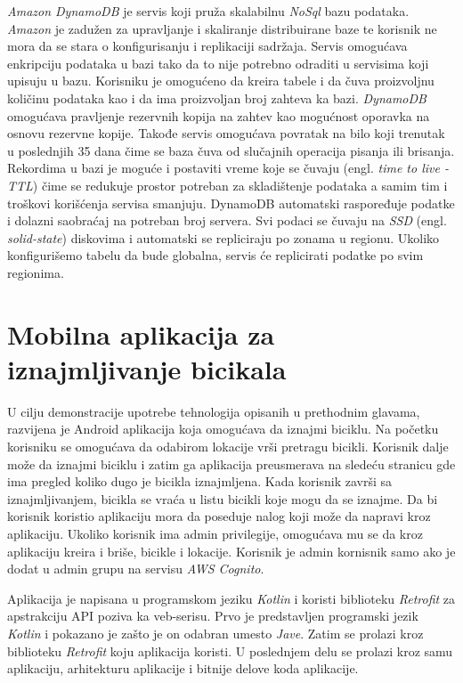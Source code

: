 \documentclass[12pt,oneside]{memoir}
\begin{document}
\emph{Amazon DynamoDB} je servis koji pruža skalabilnu \emph{NoSql} bazu podataka. \emph{Amazon} je zadužen za upravljanje i skaliranje distribuirane baze te korisnik ne mora da se stara o konfigurisanju i replikaciji sadržaja. Servis omogućava enkripciju podataka u bazi tako da to nije potrebno odraditi u servisima koji upisuju u bazu. Korisniku je omogućeno da kreira tabele i da čuva proizvoljnu količinu podataka kao i da ima proizvoljan broj zahteva ka bazi. \emph{DynamoDB} omogućava pravljenje rezervnih kopija na zahtev kao mogućnost oporavka na osnovu rezervne kopije. Takođe servis omogućava povratak na bilo koji trenutak u poslednjih 35 dana čime se baza čuva od slučajnih operacija pisanja ili brisanja. Rekordima u bazi je moguće i postaviti vreme koje se čuvaju (engl. \emph{time to live - TTL}) čime se redukuje prostor potreban za skladištenje podataka a samim tim i troškovi korišćenja servisa smanjuju. DynamoDB automatski raspoređuje podatke i dolazni saobraćaj na potreban broj servera. Svi podaci se čuvaju na \emph{SSD} (engl. \emph{solid-state}) diskovima i automatski se repliciraju po zonama u regionu. Ukoliko konfigurišemo tabelu da bude globalna, servis će replicirati podatke po svim regionima.



\chapter{Mobilna aplikacija za iznajmljivanje bicikala}
  
U cilju demonstracije upotrebe tehnologija opisanih u prethodnim glavama, razvijena je Android aplikacija koja omogućava da iznajmi biciklu. Na početku korisniku se omogućava da odabirom lokacije vrši pretragu bicikli. Korisnik dalje može da iznajmi biciklu i zatim ga aplikacija preusmerava na sledeću stranicu gde ima pregled koliko dugo je bicikla iznajmljena. Kada korisnik završi sa iznajmljivanjem, bicikla se vraća u listu bicikli koje mogu da se iznajme. Da bi korisnik koristio aplikaciju mora da poseduje nalog koji može da napravi kroz aplikaciju. Ukoliko korisnik ima admin privilegije, omogućava mu se da kroz aplikaciju kreira i briše, bicikle i lokacije. Korisnik je admin kornisnik samo ako je dodat u admin grupu na servisu \emph{AWS Cognito}.
  
Aplikacija je napisana u programskom jeziku \emph{Kotlin} i koristi  biblioteku \emph{Retrofit} za apstrakciju API poziva ka veb-serisu. Prvo je predstavljen programski jezik \emph{Kotlin} i pokazano je zašto je on odabran umesto \emph{Jave}. Zatim se prolazi kroz biblioteku \emph{Retrofit} koju aplikacija koristi. U poslednjem delu se prolazi kroz samu aplikaciju, arhitekturu aplikacije i bitnije delove koda aplikacije.
\end{document}
